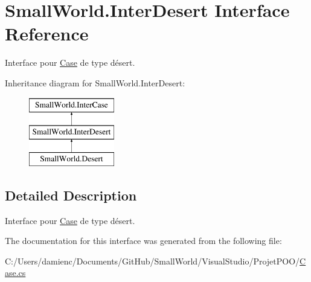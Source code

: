 \hypertarget{interface_small_world_1_1_inter_desert}{\section{Small\-World.\-Inter\-Desert Interface Reference}
\label{interface_small_world_1_1_inter_desert}
}


Interface pour \hyperlink{class_small_world_1_1_case}{Case} de type désert.  


Inheritance diagram for Small\-World.\-Inter\-Desert\-:\begin{figure}[H]
\begin{center}
\leavevmode
\includegraphics[height=3.000000cm]{interface_small_world_1_1_inter_desert}
\end{center}
\end{figure}


\subsection{Detailed Description}
Interface pour \hyperlink{class_small_world_1_1_case}{Case} de type désert. 

The documentation for this interface was generated from the following file\-:\begin{DoxyCompactItemize}
\item 
C\-:/\-Users/damienc/\-Documents/\-Git\-Hub/\-Small\-World/\-Visual\-Studio/\-Projet\-P\-O\-O/\hyperlink{_case_8cs}{Case.\-cs}\end{DoxyCompactItemize}
